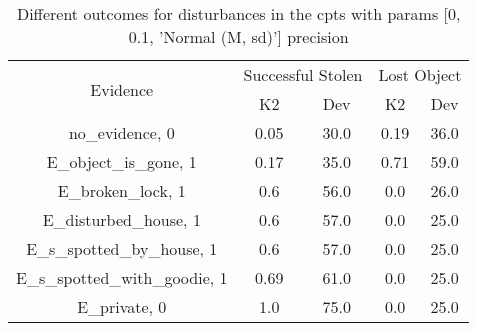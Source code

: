 \begin{table}\begin{tabular}{c|cc|cc}\toprule\multirow{2}{*}{Evidence} & \multicolumn{2}{c}{Successful Stolen} & \multicolumn{2}{c}{Lost Object} \\& {K2} & {Dev} & {K2} & {Dev} \\\midrule
no\_evidence, 0 & \cellcolor{Bittersweet}0.05&\cellcolor{Bittersweet}30.0&\cellcolor{Bittersweet}0.19&\cellcolor{Bittersweet}36.0\\E\_object\_is\_gone, 1 & \cellcolor{Bittersweet}0.17&\cellcolor{Bittersweet}35.0&\cellcolor{Bittersweet}0.71&\cellcolor{Bittersweet}59.0\\E\_broken\_lock, 1 & 0.6&56.0&\cellcolor{Bittersweet}0.0&\cellcolor{Bittersweet}26.0\\E\_disturbed\_house, 1 & 0.6&57.0&\cellcolor{Bittersweet}0.0&\cellcolor{Bittersweet}25.0\\E\_s\_spotted\_by\_house, 1 & 0.6&57.0&\cellcolor{Bittersweet}0.0&\cellcolor{Bittersweet}25.0\\E\_s\_spotted\_with\_goodie, 1 & \cellcolor{Bittersweet}0.69&\cellcolor{Bittersweet}61.0&\cellcolor{Bittersweet}0.0&\cellcolor{Bittersweet}25.0\\E\_private, 0 & \cellcolor{Bittersweet}1.0&\cellcolor{Bittersweet}75.0&\cellcolor{Bittersweet}0.0&\cellcolor{Bittersweet}25.0\\\bottomrule\end{tabular}\caption{Different outcomes for disturbances in the cpts with params [0, 0.1, 'Normal (M, sd)'] precision}\end{table}